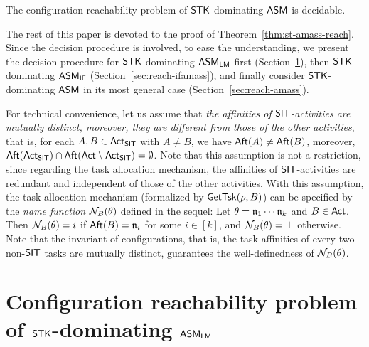 \begin{theorem}\label{thm:st-amass-reach}
The configuration reachability problem of $\mathsf{STK}$-dominating $\textsf{ASM}$ is decidable.
\end{theorem}

The rest of this paper is devoted to the proof of Theorem~\ref{thm:st-amass-reach}. Since the decision procedure is involved, to ease the understanding, we present the decision procedure for ${\sf STK}$-dominating $\textsf{ASM}_\textsf{LM}$ first (Section~\ref{sec:reach-lmamass}), then ${\sf STK}$-dominating $\textsf{ASM}_\textsf{IF}$ (Section~\ref{sec:reach-ifamass}), and finally consider ${\sf STK}$-dominating $\textsf{ASM}$ in its most general case (Section~\ref{sec:reach-amass}). 

For technical convenience, let us assume that \emph{the affinities of ${\sf SIT}$-activities are mutually distinct, moreover, they are different from those of the other activities}, that is, for each $A, B \in {\sf Act}_{\sf SIT}$ with $A \neq B$, we have ${\sf Aft}(A) \neq {\sf Aft}(B)$, moreover, ${\sf Aft}({\sf Act}_{\sf SIT}) \cap {\sf Aft}({\sf Act} \setminus {\sf Act}_{\sf SIT}) = \emptyset$. Note that this assumption is not a restriction, since regarding the task allocation mechanism, the affinities of ${\sf SIT}$-activities are redundant and independent of those of the other activities. With this assumption, the task allocation mechanism (formalized by $\mathsf{GetTsk}(\rho, B)$) can be specified by the \emph{name function} $\mathcal{N}_B(\theta)$ defined in the sequel:  Let $\theta = \mathfrak{n}_1 \cdots \mathfrak{n}_k$ and $B \in {\sf Act}$. Then $\mathcal{N}_B(\theta) = i$ if ${\sf Aft}(B) = \mathfrak{n}_i$ for some $i \in [k]$, and $\mathcal{N}_B(\theta) = \bot$ otherwise. Note that the invariant of configurations, that is, the task affinities of every two non-${\sf SIT}$ tasks are mutually distinct, guarantees the well-definedness of $\mathcal{N}_B(\theta)$.




\section{Configuration reachability problem of $\mathsf{STK}$-dominating $\textsf{ASM}_\textsf{LM}$}\label{sec:reach-lmamass}


